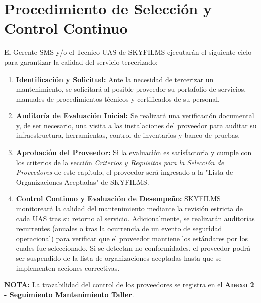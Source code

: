 \section{Procedimiento de Selección y Control Continuo}
El Gerente SMS y/o el Tecnico UAS de SKYFILMS ejecutarán el siguiente ciclo para garantizar la calidad del servicio tercerizado:

\begin{enumerate}
    \item \textbf{Identificación y Solicitud:} Ante la necesidad de tercerizar un mantenimiento, se solicitará al posible proveedor su portafolio de servicios, manuales de procedimientos técnicos y certificados de su personal.

    \item \textbf{Auditoría de Evaluación Inicial:} Se realizará una verificación documental y, de ser necesario, una visita a las instalaciones del proveedor para auditar su infraestructura, herramientas, control de inventarios y banco de pruebas.

    \item \textbf{Aprobación del Proveedor:} Si la evaluación es satisfactoria y cumple con los criterios de la sección \textit{Criterios y Requisitos para la Selección de Proveedores} de este capítulo, el proveedor será ingresado a la "Lista de Organizaciones Aceptadas" de SKYFILMS.

    \item \textbf{Control Continuo y Evaluación de Desempeño:} SKYFILMS monitoreará la calidad del mantenimiento mediante la revisión estricta de cada UAS tras su retorno al servicio. Adicionalmente, se realizarán auditorías recurrentes (anuales o tras la ocurrencia de un evento de seguridad operacional) para verificar que el proveedor mantiene los estándares por los cuales fue seleccionado. Si se detectan no conformidades, el proveedor podrá ser suspendido de la lista de organizaciones aceptadas hasta que se implementen acciones correctivas.
\end{enumerate}

\textbf{NOTA:} La trazabilidad del control de los proveedores se registra en el \textbf{Anexo 2 - Seguimiento Mantenimiento Taller}.

